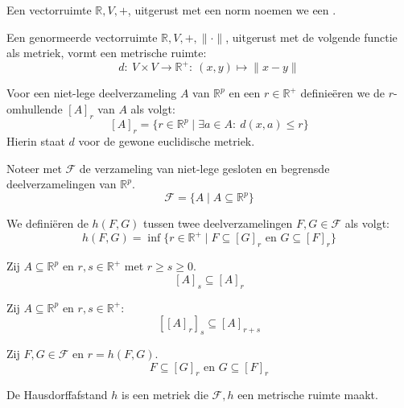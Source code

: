 \documentclass[main.tex]{subfiles}
\begin{document}
\begin{de}
  Een vectorruimte $\mathbb{R},V,+$, uitgerust met een norm noemen we een .
\end{de}

\begin{st}
  Een genormeerde vectorruimte $\mathbb{R},V,+,\|\cdot\|$, uitgerust met de volgende functie als metriek, vormt een metrische ruimte:
  \[ d:\ V \times V \rightarrow \mathbb{R}^{+}:\ (x,y) \mapsto \|x-y\| \]
\end{st}

\begin{de}
  Voor een niet-lege deelverzameling $A$ van $\mathbb{R}^{p}$ en een $r\in \mathbb{R}^{+}$ definie\"eren we de $r$-omhullende $[A]_{r}$ van $A$ als volgt:
  \[ [A]_{r} = \{r \in \mathbb{R}^{p} \mid \exists a \in A:\ d(x,a) \le r \} \]
  Hierin staat $d$ voor de gewone euclidische metriek.
\end{de}

\begin{de}
  Noteer met $\mathcal{F}$ de verzameling van niet-lege gesloten en begrensde deelverzamelingen van $\mathbb{R}^{p}$.
  \[ \mathcal{F} = \{ A \mid A \subseteq \mathbb{R}^{p} \} \]
\end{de}

\begin{de}
  We defini\"eren de  $h(F,G)$ tussen twee deelverzamelingen $F,G \in \mathcal{F}$ als volgt:
  \[ h(F,G) = \inf\{ r\in \mathbb{R}^{+} \mid F \subseteq [G]_{r} \text{ en } G \subseteq [F]_{r} \} \]
\end{de}

\begin{blem}
  Zij $A \subseteq \mathbb{R}^{p}$ en $r,s\in\mathbb{R}^{+}$ met $r\ge s \ge 0$.
  \[ [A]_{s} \subseteq [A]_{r} \]
\end{blem}

\begin{blem}
  Zij $A \subseteq \mathbb{R}^{p}$ en $r,s\in\mathbb{R}^{+}$:
  \[ \left[ [A]_{r}\right]_{s} \subseteq [A]_{r+s} \]
\end{blem}

\begin{blem}
  Zij $F,G \in \mathcal{F}$ en $r=h(F,G)$.
  \[ F \subseteq [G]_{r} \text{ en } G \subseteq [F]_{r} \]
\end{blem}

\begin{pr}
  De Hausdorffafstand $h$ is een metriek die $\mathcal{F},h$ een metrische ruimte maakt.
\end{pr}
\end{document}
